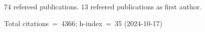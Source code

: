 74 refereed publications. 13 refeered publications as first author.

Total citations~=~4366; h-index~=~35 (2024-10-17)